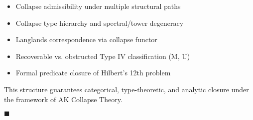 \documentclass[11pt]{article}
\begin{document}
\begin{itemize}
  \item Collapse admissibility under multiple structural paths
  \item Collapse type hierarchy and spectral/tower degeneracy
  \item Langlands correspondence via collapse functor
  \item Recoverable vs. obstructed Type IV classification (M, U)
  \item Formal predicate closure of Hilbert's 12th problem
\end{itemize}

This structure guarantees categorical, type-theoretic, and analytic closure under the framework of AK Collapse Theory.

\hfill $\blacksquare$
\end{document}
